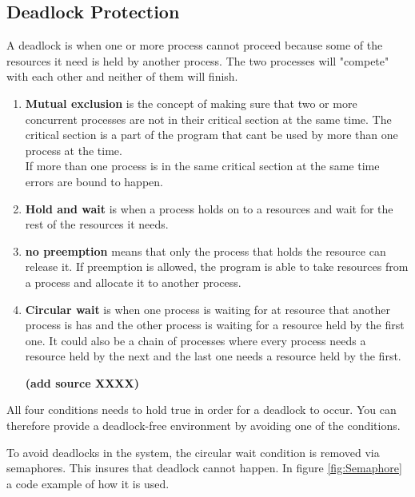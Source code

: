 \subsection{Deadlock Protection}
\label{sec:DeadlockProtection}

A deadlock is when one or more process cannot proceed because some of the resources it need is held by another process. The two processes will "compete" with each other and neither of them will finish.
 
\begin{enumerate}[noitemsep]
	
	\item \textbf{Mutual exclusion} is the concept of making sure that two or more concurrent processes are not in their critical section at the same time. The critical section is a part of the program that cant be used by more than one process at the time.\\ If more than one process is in the same critical section at the same time errors are bound to happen.
	
	\item \textbf{Hold and wait} is when a process holds on to a resources and wait for the rest of the resources it needs.
	
	\item \textbf{no preemption} means that only the process that holds the resource can release it. If preemption is allowed, the program is able to take resources from a process and allocate it to another process.
	
	\item \textbf{Circular wait} is when one process is waiting for at resource that another process is has and the other process is waiting for a resource held by the first one. It could also be a chain of processes where every process needs a resource held by the next and the last one needs a resource held by the first.
	
\textbf{(add source XXXX)}
	
\end{enumerate}

All four conditions needs to hold true in order for a deadlock to occur. You can therefore provide a deadlock-free environment by avoiding one of the conditions. 

To avoid deadlocks in the system, the circular wait condition is removed via semaphores. This insures that deadlock cannot happen. In figure \ref{fig:Semaphore} a code example of how it is used.

